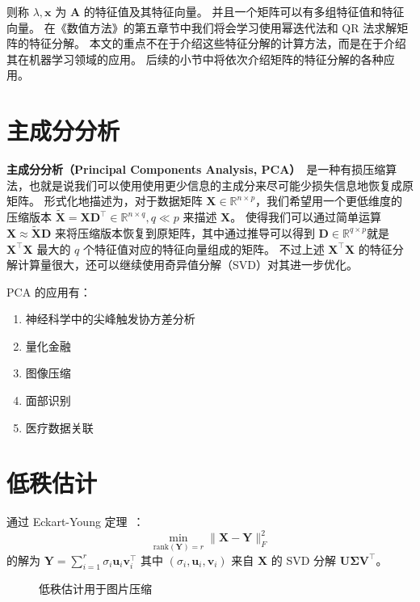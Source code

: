 则称 $\lambda, \bm{x}$ 为 $\bm{A}$ 的特征值及其特征向量。
并且一个矩阵可以有多组特征值和特征向量。
在《数值方法》的第五章节中我们将会学习使用幂迭代法和 QR 法求解矩阵的特征分解。
本文的重点不在于介绍这些特征分解的计算方法，而是在于介绍其在机器学习领域的应用。
后续的小节中将依次介绍矩阵的特征分解的各种应用。

\section{主成分分析}
\textbf{主成分分析（Principal Components Analysis, PCA）}~\cite{PCA}是一种有损压缩算法，也就是说我们可以使用使用更少信息的主成分来尽可能少损失信息地恢复成原矩阵。
形式化地描述为，对于数据矩阵 $\bm{X} \in \mathbb{R}^{n \times p}$，我们希望用一个更低维度的压缩版本 $\tilde{\bm{X}} = \bm{X}\bm{D}^\top\in \mathbb{R}^{n \times q}, q \ll p$ 来描述 $\bm{X}$。
使得我们可以通过简单运算 $\bm{X} \approx \tilde{\bm{X}} \bm{D}$ 来将压缩版本恢复到原矩阵，其中通过推导可以得到 $\bm{D} \in \mathbb{R}^{q \times p}$就是 $\bm{X}^\top \bm{X}$ 最大的 $q$ 个特征值对应的特征向量组成的矩阵。
不过上述 $\bm{X}^\top \bm{X}$ 的特征分解计算量很大，还可以继续使用奇异值分解（SVD）对其进一步优化。

PCA 的应用有：

\begin{enumerate}
	\item 神经科学中的尖峰触发协方差分析
	\item 量化金融
	\item 图像压缩
	\item 面部识别
	\item 医疗数据关联
\end{enumerate}

\section{低秩估计}
通过 Eckart-Young 定理~\cite{Eckart1936_lowrank}：
\begin{equation}
	\min_{\text{rank}(\bm{Y}) = r} \lVert \bm{X} - \bm{Y} \rVert_F^2
\end{equation}
的解为 $\bm{Y} = \sum_{i=1}^r \sigma_i \bm{u}_i \bm{v}_i^\top$ 其中 $(\sigma_i, \bm{u}_i, \bm{v}_i)$ 来自 $\bm{X}$ 的 SVD 分解 $\bm{U\Sigma}\bm{V}^\top$。

\begin{figure}
	\begin{minipage}{.5\linewidth}
		\centering
	\end{minipage}%
	\begin{minipage}{.5\linewidth}
		\centering
	\end{minipage}\par\medskip
	\centering
	\caption{低秩估计用于图片压缩}
	\label{fig:low_rank}
\end{figure}

